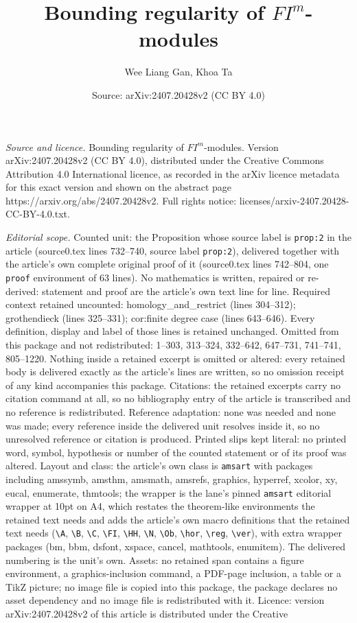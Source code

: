 \documentclass[10pt,a4paper]{amsart}
\title[Bounding regularity of $FI^m$-modules]{Bounding regularity of $FI^m$-modules}
\author{Wee Liang Gan, Khoa Ta}
\date{Source: arXiv:2407.20428v2 (CC BY 4.0)}
\begin{document}
\maketitle

\noindent\emph{Source and licence.} Bounding regularity of $FI^m$-modules. Version arXiv:2407.20428v2 (CC BY 4.0), distributed under the Creative Commons Attribution 4.0 International licence, as recorded in the arXiv licence metadata for this exact version and shown on the abstract page https://arxiv.org/abs/2407.20428v2. Full rights notice: licenses/arxiv-2407.20428-CC-BY-4.0.txt.\par\smallskip

\noindent\textit{Editorial scope.} Counted unit: the Proposition whose source label is \texttt{prop:2} in the article (source0.tex lines 732--740, source label \texttt{prop:2}), delivered together with the article's own complete original proof of it (source0.tex lines 742--804, one \texttt{proof} environment of 63 lines). No mathematics is written, repaired or re-derived: statement and proof are the article's own text line for line. Required context retained uncounted: homology\_and\_restrict (lines 304--312); grothendieck (lines 325--331); cor:finite degree case (lines 643--646). Every definition, display and label of those lines is retained unchanged. Omitted from this package and not redistributed: 1--303, 313--324, 332--642, 647--731, 741--741, 805--1220. Nothing inside a retained excerpt is omitted or altered: every retained body is delivered exactly as the article's lines are written, so no omission receipt of any kind accompanies this package. Citations: the retained excerpts carry no citation command at all, so no bibliography entry of the article is transcribed and no reference is redistributed. Reference adaptation: none was needed and none was made; every reference inside the delivered unit resolves inside it, so no unresolved reference or citation is produced. Printed slips kept literal: no printed word, symbol, hypothesis or number of the counted statement or of its proof was altered. Layout and class: the article's own class is \texttt{amsart} with packages including amssymb, amsthm, amsmath, amsrefs, graphics, hyperref, xcolor, xy, eucal, enumerate, thmtools; the wrapper is the lane's pinned \texttt{amsart} editorial wrapper at 10pt on A4, which restates the theorem-like environments the retained text needs and adds the article's own macro definitions that the retained text needs (\texttt{\textbackslash A}, \texttt{\textbackslash B}, \texttt{\textbackslash C}, \texttt{\textbackslash FI}, \texttt{\textbackslash HH}, \texttt{\textbackslash N}, \texttt{\textbackslash Ob}, \texttt{\textbackslash hor}, \texttt{\textbackslash reg}, \texttt{\textbackslash ver}), with extra wrapper packages (bm, bbm, dsfont, xspace, cancel, mathtools, enumitem). The delivered numbering is the unit's own. Assets: no retained span contains a figure environment, a graphics-inclusion command, a PDF-page inclusion, a table or a TikZ picture; no image file is copied into this package, the package declares no asset dependency and no image file is redistributed with it. Licence: version arXiv:2407.20428v2 of this article is distributed under the Creative 
\end{document}
